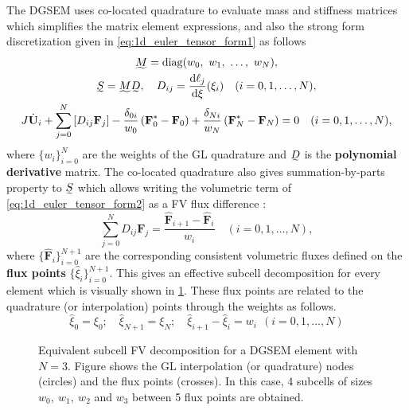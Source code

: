\documentclass[a4paper,11pt,oneside]{article}
\newcommand{\newword}[1]{\textbf{#1}} %
\newcommand{\vect}[1]{\ensuremath{\boldsymbol{\mathbf{#1}}}} %
\newcommand{\der}[2]{\frac{\sdd #1}{\sdd #2}}
\newcommand{\sdd}{\ensuremath{\text{d}}} %
\DeclareMathOperator{\diag}{diag} %
\newcommand{\linalgmat}[1]{\ensuremath{\undertilde{#1}}} %
\newcommand{\eulerref}[1]{\ensuremath{#1}} %
\begin{document}
The DGSEM uses co-located quadrature to evaluate mass and stiffness matrices which simplifies the matrix element expressions, and also the strong form discretization given in \cref{eq:1d_euler_tensor_form1} as follows
\begin{gather}
	\linalgmat{M} = \diag(w_0,\ w_1,\ \ldots,\ w_N),
	\label{eq:dgsem_mass_matrix} \nonumber\\
	\linalgmat{S} = \linalgmat{M} \linalgmat{D}, \quad D_{ij} = \der{\ell_j}{\xi}(\xi_i) \quad (i=0,1,\ldots,N),
	\label{eq:dgsem_polynomial_derivative_matrix} \nonumber\\
	J \dot{\vect{\eulerref{U}}}_i + \sum_{j=0}^{N} \left[ D_{ij} \vect{\eulerref{F}}_j \right] - \frac{\delta_{0i}}{w_0} \left( \vect{\eulerref{F}}^*_0 - \vect{\eulerref{F}}_0 \right) + \frac{\delta_{Ni}}{w_N} \left( \vect{\eulerref{F}}^*_N - \vect{\eulerref{F}}_N \right) = 0 \quad (i=0,1,\ldots,N),
	\label{eq:1d_euler_tensor_form2}
\end{gather}
where $\{w_i\}_{i=0}^{N}$ are the weights of the GL quadrature and $\linalgmat{D}$ is the \newword{polynomial derivative} matrix. The co-located quadrature also gives summation-by-parts property to $\linalgmat{S}$ which allows writing the volumetric term of \cref{eq:1d_euler_tensor_form2} as a FV flux difference \cite{fisherCarpenterNordstrom2013}:
\begin{equation}
	\sum_{j=0}^{N} D_{ij} \vect{\eulerref{F}}_j = \frac{\hat{\vect{\eulerref{F}}}_{i+1} - \hat{\vect{\eulerref{F}}}_i}{w_i} \quad (i=0,1,\ldots,N),
	\label{eq:telescopic_form}
\end{equation}
where $\{\hat{\vect{\eulerref{F}}}_i\}_{i=0}^{N+1}$ are the corresponding consistent volumetric fluxes defined on the \newword{flux points} $\{\hat{\xi}_i\}_{i=0}^{N+1}$. This gives an effective subcell decomposition for every element which is visually shown in \cref{fig:dgsem_subcell_fc_equivalence}. These flux points are related to the quadrature (or interpolation) points through the weights as follows.
\begin{equation*}
	\hat{\xi}_0 = \xi_0; \quad \hat{\xi}_{N+1} = \xi_N;\quad
	\hat{\xi}_{i+1} - \hat{\xi}_i = w_i\ \  (i=0,1,\ldots,N)
	\label{eq:flux_points}
\end{equation*}
\begin{figure}[htbp]
	\centering
	
	\caption{Equivalent subcell FV decomposition for a DGSEM element with $N=3$. Figure shows the GL interpolation (or quadrature) nodes (circles) and the flux points (crosses). In this case, 4 subcells of sizes $w_0,\ w_1,\ w_2$ and $w_3$ between 5 flux points are obtained.}
	\label{fig:dgsem_subcell_fc_equivalence}
\end{figure}
\end{document}
